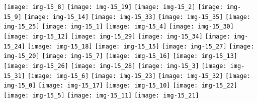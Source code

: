 \documentclass[a4paper]{article}
\begin{document}
	\texttt{[image: img-15\_8]}
	\texttt{[image: img-15\_19]}
	\texttt{[image: img-15\_2]}
	\texttt{[image: img-15\_9]}
	\texttt{[image: img-15\_14]}
	\texttt{[image: img-15\_33]}
	\texttt{[image: img-15\_35]}
	\texttt{[image: img-15\_25]}
	\texttt{[image: img-15\_1]}
	\texttt{[image: img-15\_4]}
	\texttt{[image: img-15\_30]}
	\texttt{[image: img-15\_12]}
	\texttt{[image: img-15\_29]}
	\texttt{[image: img-15\_34]}
	\texttt{[image: img-15\_24]}
	\texttt{[image: img-15\_18]}
	\texttt{[image: img-15\_15]}
	\texttt{[image: img-15\_27]}
	\texttt{[image: img-15\_20]}
	\texttt{[image: img-15\_7]}
	\texttt{[image: img-15\_16]}
	\texttt{[image: img-15\_13]}
	\texttt{[image: img-15\_26]}
	\texttt{[image: img-15\_28]}
	\texttt{[image: img-15\_3]}
	\texttt{[image: img-15\_31]}
	\texttt{[image: img-15\_6]}
	\texttt{[image: img-15\_23]}
	\texttt{[image: img-15\_32]}
	\texttt{[image: img-15\_0]}
	\texttt{[image: img-15\_17]}
	\texttt{[image: img-15\_10]}
	\texttt{[image: img-15\_22]}
	\texttt{[image: img-15\_5]}
	\texttt{[image: img-15\_11]}
	\texttt{[image: img-15\_21]}
\end{document}
